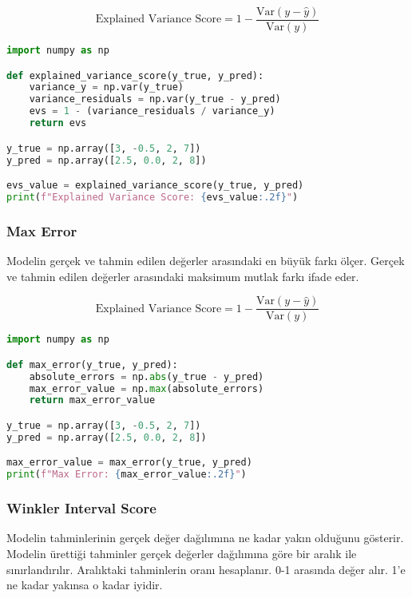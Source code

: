 \[\text{Explained Variance Score} = 1 - \frac{\text{Var}(y - \hat{y})}{\text{Var}(y)}\]

\begin{lstlisting}[language=Python]
import numpy as np

def explained_variance_score(y_true, y_pred):
    variance_y = np.var(y_true)
    variance_residuals = np.var(y_true - y_pred)
    evs = 1 - (variance_residuals / variance_y)
    return evs

y_true = np.array([3, -0.5, 2, 7])
y_pred = np.array([2.5, 0.0, 2, 8])

evs_value = explained_variance_score(y_true, y_pred)
print(f"Explained Variance Score: {evs_value:.2f}")
\end{lstlisting}

\newpage

\subsubsection{Max Error}

Modelin gerçek ve tahmin edilen değerler arasındaki en büyük farkı ölçer. Gerçek ve tahmin edilen değerler arasındaki maksimum mutlak farkı ifade eder.

\[\text{Explained Variance Score} = 1 - \frac{\text{Var}(y - \hat{y})}{\text{Var}(y)}\]

\begin{lstlisting}[language=Python]
import numpy as np

def max_error(y_true, y_pred):
    absolute_errors = np.abs(y_true - y_pred)
    max_error_value = np.max(absolute_errors)
    return max_error_value

y_true = np.array([3, -0.5, 2, 7])
y_pred = np.array([2.5, 0.0, 2, 8])

max_error_value = max_error(y_true, y_pred)
print(f"Max Error: {max_error_value:.2f}")
\end{lstlisting}

\newpage

\subsubsection{Winkler Interval Score}

Modelin tahminlerinin gerçek değer dağılımına ne kadar yakın olduğunu gösterir. Modelin ürettiği tahminler gerçek değerler dağılımına göre bir aralık ile sınırlandırılır. Aralıktaki tahminlerin oranı hesaplanır. 0-1 arasında değer alır. 1'e ne kadar yakınsa o kadar iyidir.

